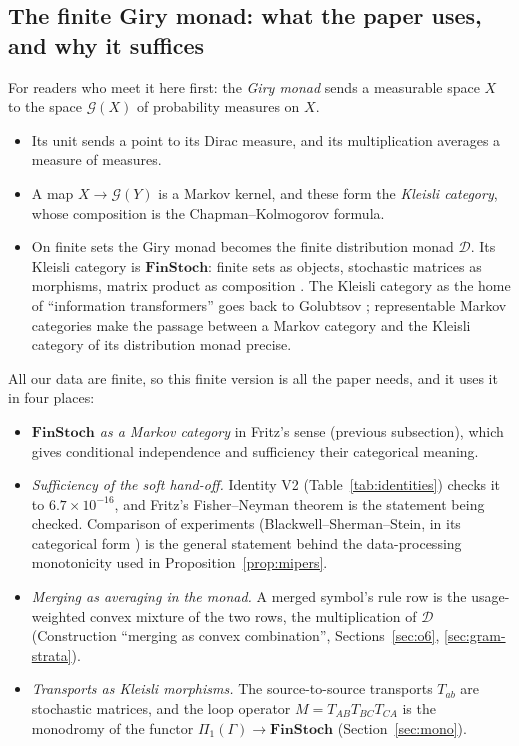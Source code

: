 \documentclass[11pt]{article}
\theoremstyle{definition}
\theoremstyle{remark}
\begin{document}
\subsection{The finite Giry monad: what the paper uses, and why it suffices}\label{sec:giry}
For readers who meet it here first: the \emph{Giry monad} \cite{giry} sends a measurable space $X$ to the space $\mathcal G(X)$ of probability measures on $X$.
\begin{itemize}
  \item Its unit sends a point to its Dirac measure, and its multiplication averages a measure of measures.
  \item A map $X\to\mathcal G(Y)$ is a Markov kernel, and these form the \emph{Kleisli category}, whose composition is the Chapman--Kolmogorov formula.
  \item On finite sets the Giry monad becomes the finite distribution monad $\mathcal D$. Its Kleisli category is $\mathbf{FinStoch}$: finite sets as objects, stochastic matrices as morphisms, matrix product as composition \cite{fritz}. The Kleisli category as the home of ``information transformers'' goes back to Golubtsov \cite{golubtsov02}; representable Markov categories \cite{fgpr20} make the passage between a Markov category and the Kleisli category of its distribution monad precise.
\end{itemize}
All our data are finite, so this finite version is all the paper needs, and it uses it in four places:
\begin{itemize}
  \item \emph{$\mathbf{FinStoch}$ as a Markov category} in Fritz's sense (previous subsection), which gives conditional independence and sufficiency their categorical meaning.
  \item \emph{Sufficiency of the soft hand-off.} Identity V2 (Table~\ref{tab:identities}) checks it to $6.7\times10^{-16}$, and Fritz's Fisher--Neyman theorem is the statement being checked. Comparison of experiments (Blackwell--Sherman--Stein, in its categorical form \cite{fgpr20}) is the general statement behind the data-processing monotonicity used in Proposition~\ref{prop:mipers}.
  \item \emph{Merging as averaging in the monad.} A merged symbol's rule row is the usage-weighted convex mixture of the two rows, the multiplication of $\mathcal D$ (Construction ``merging as convex combination'', Sections~\ref{sec:o6}, \ref{sec:gram-strata}).
  \item \emph{Transports as Kleisli morphisms.} The source-to-source transports $T_{ab}$ are stochastic matrices, and the loop operator $M=T_{AB}T_{BC}T_{CA}$ is the monodromy of the functor $\Pi_1(\Gamma)\to\mathbf{FinStoch}$ (Section~\ref{sec:mono}).
\end{itemize}
\end{document}
